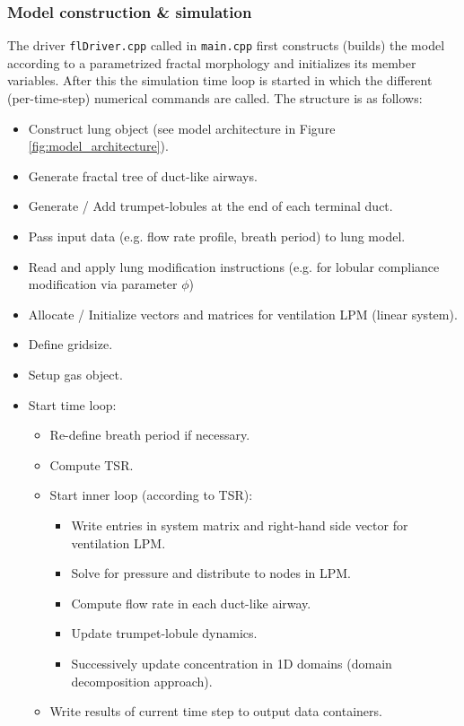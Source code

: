 \subsubsection{Model construction \& simulation}
The driver \texttt{flDriver.cpp} called in \texttt{main.cpp} first constructs (builds) the model according to a parametrized fractal morphology and initializes its member variables.
After this the simulation time loop is started in which the different (per-time-step) numerical commands are called.
The structure is as follows:
\begin{itemize}
  \item Construct lung object (see model architecture in Figure \ref{fig:model_architecture}).
  \item Generate fractal tree of duct-like airways.
  \item Generate / Add trumpet-lobules at the end of each terminal duct.
  \item Pass input data (e.g. flow rate profile, breath period) to lung model.
  \item Read and apply lung modification instructions (e.g. for lobular compliance modification via parameter $\phi$)
  \item Allocate / Initialize vectors and matrices for ventilation LPM (linear system).
  \item Define gridsize.
  \item Setup gas object.
  \item Start time loop:
  \begin{itemize}
    \item Re-define breath period if necessary.
    \item Compute TSR.
    \item Start inner loop (according to TSR):
    \begin{itemize}
      \item Write entries in system matrix and right-hand side vector for ventilation LPM.
      \item Solve for pressure and distribute to nodes in LPM.
      \item Compute flow rate in each duct-like airway.
      \item Update trumpet-lobule dynamics.
      \item Successively update concentration in 1D domains (domain decomposition approach).
    \end{itemize}
    \item Write results of current time step to output data containers.
  \end{itemize}
\end{itemize}


